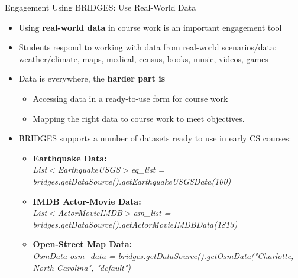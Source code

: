 \documentclass[aspectratio=169]{beamer}
\begin{document}
%
\begin{frame}{Engagement Using BRIDGES: Use Real-World Data}

\begin{itemize}
\item Using \textbf{real-world data} in course work is an important engagement tool
\item Students respond to working with data from real-world scenarios/data:
	weather/climate, maps, medical, census, books, music, videos, games
\item Data is everywhere, the \textbf{harder part is} 
	\begin{itemize}
		\item Accessing data in a ready-to-use form for course work
		\item Mapping the right data to course work to meet objectives.
	\end{itemize}
\item BRIDGES supports a number of datasets ready to use in early CS courses:
	\begin{itemize}
	\item \textbf{Earthquake Data:} \\
		\textsl{List$<$EarthquakeUSGS$>$eq\_list = bridges.getDataSource().getEarthquakeUSGSData(100) }
	\item \textbf{IMDB Actor-Movie Data:}\\
		\textsl{List$<$ActorMovieIMDB$>$am\_list} \textsl{= bridges.getDataSource().getActorMovieIMDBData(1813) }
	\item \textbf{Open-Street Map Data:}\\
		\textsl{OsmData osm\_data = bridges.getDataSource().getOsmData("Charlotte, North Carolina", "default")}

	\end{itemize}
\end{itemize}
\end{frame}
\end{document}
